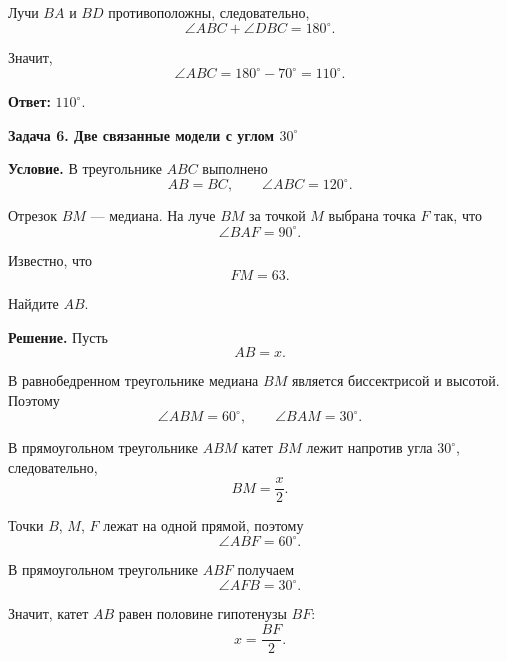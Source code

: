\documentclass[a4paper,12pt]{article}
\newcommand{\Subsection}[1]{%
  \Needspace{3\baselineskip}%
  \vspace{0.45em}%
  {\large\bfseries\color{darkaccent}#1}\par
  \vspace{0.15em}%
}
\newcommand{\Key}[1]{\textbf{\color{darkaccent}#1}}
\newcommand{\degree}{^{\circ}}
\begin{document}
Лучи $BA$ и $BD$ противоположны, следовательно,
\[
  \angle ABC+\angle DBC=180\degree.
\]

Значит,
\[
  \angle ABC
  =
  180\degree-70\degree
  =
  110\degree.
\]

\Key{Ответ:} $110\degree$.


\Subsection{Задача 6. Две связанные модели с углом $30\degree$}

\Key{Условие.}
В треугольнике $ABC$ выполнено
\[
  AB=BC,
  \qquad
  \angle ABC=120\degree.
\]

Отрезок $BM$ — медиана.
На луче $BM$ за точкой $M$ выбрана точка $F$ так, что
\[
  \angle BAF=90\degree.
\]

Известно, что
\[
  FM=63.
\]

Найдите $AB$.

\begin{center}
\end{center}

\Key{Решение.}
Пусть
\[
  AB=x.
\]

В равнобедренном треугольнике медиана $BM$ является биссектрисой и высотой.
Поэтому
\[
  \angle ABM=60\degree,
  \qquad
  \angle BAM=30\degree.
\]

В прямоугольном треугольнике $ABM$ катет $BM$ лежит напротив угла
$30\degree$, следовательно,
\[
  BM=\frac{x}{2}.
\]

Точки $B$, $M$, $F$ лежат на одной прямой, поэтому
\[
  \angle ABF=60\degree.
\]

В прямоугольном треугольнике $ABF$ получаем
\[
  \angle AFB=30\degree.
\]

Значит, катет $AB$ равен половине гипотенузы $BF$:
\[
  x=\frac{BF}{2}.
\]
\end{document}
